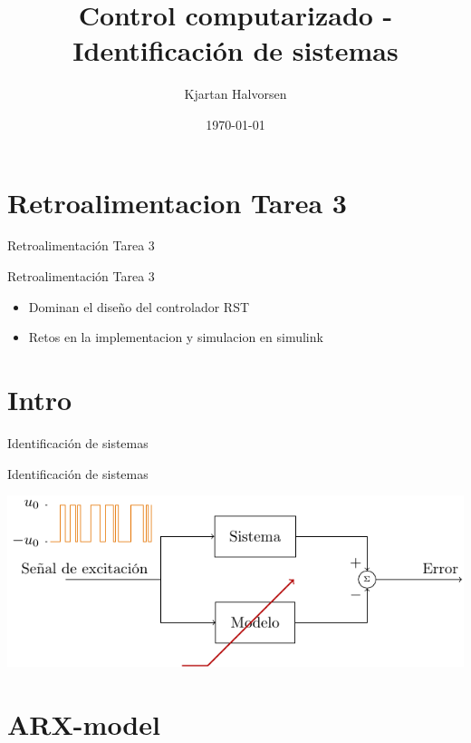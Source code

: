 \documentclass[presentation,aspectratio=169]{beamer}
\author{Kjartan Halvorsen}
\date{\today}
\title{Control computarizado - Identificación de sistemas}
\begin{document}
\maketitle

\section{Retroalimentacion Tarea 3}
\label{sec:org14bb150}

\begin{frame}[label={sec:org1b780b1}]{Retroalimentación Tarea 3}
\end{frame}

\begin{frame}[label={sec:org3dbf91d}]{Retroalimentación Tarea 3}
\begin{itemize}
\item Dominan el diseño del controlador RST
\item Retos en la implementacion y simulacion en simulink
\end{itemize}
\end{frame}

\section{Intro}
\label{sec:org08be703}
\begin{frame}[label={sec:orgdddf6e3}]{Identificación de sistemas}
\end{frame}
\begin{frame}[label={sec:org7073d5c}]{Identificación de sistemas}
\begin{center}
\includegraphics[]{sysid-graphic} 
\end{center}
\end{frame}

\section{ARX-model}
\label{sec:orga698171}
\end{document}
